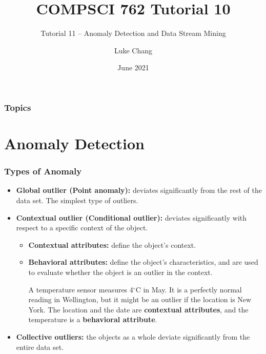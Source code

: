\documentclass[aspectratio=169, 10pt]{beamer}
\title{COMPSCI 762 Tutorial 10}
\subtitle{Tutorial 11 -- Anomaly Detection and Data Stream Mining}
\author{Luke Chang}
\institute{The University of Auckland}
\date{June 2021}
\begin{document}
\frame{\titlepage}

\begin{frame}
    \frametitle{Topics}

    \tableofcontents
        
\end{frame}

\section{Anomaly Detection}
\begin{frame}
\frametitle{Types of Anomaly}

\begin{itemize}
    \item \textbf{Global outlier (Point anomaly):} deviates significantly from the rest of the data set. 
    The simplest type of outliers.
    \item \textbf{Contextual outlier (Conditional outlier):} deviates significantly with respect to a specific context of the object.
        \begin{itemize}
            \item \textbf{Contextual attributes:} define the object’s context.
            \item \textbf{Behavioral attributes:} define the object’s characteristics, and are used to evaluate
            whether the object is an outlier in the context.
        \begin{example}
            A temperature sensor measures 4$^{\circ}$C in May. It is a perfectly normal reading in Wellington, but it might be an outlier if the location is New York.
            The location and the date are \textbf{contextual attributes}, and the temperature is a \textbf{behavioral attribute}.
        \end{example}
    \end{itemize}
    \item \textbf{Collective outliers:} the objects as a whole deviate significantly from the entire data set.
\end{itemize}

\end{frame}
\end{document}
